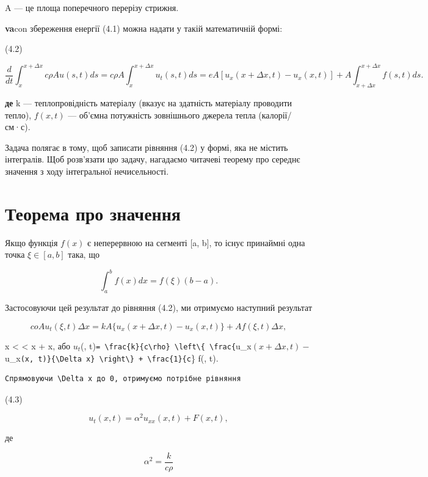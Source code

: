 \documentclass[
  ukrainian,
]{article}
\begin{document}
A --- це площа поперечного перерізу стрижня.

\textbf{va}con збереження енергії (4.1) можна надати у такій
математичній формі:

(4.2)

\[
\frac{d}{dt} \int_{x}^{x+\Delta x} c\rho Au(s, t) ds = c\rho A \int_{x}^{x+\Delta x} u_{t}(s, t) ds = eA \left[ u_{x}(x+\Delta x, t) - u_{x}(x, t) \right] + A \int_{x+\Delta x}^{x+\Delta x} f(s, t) ds.
\]

\textbf{де} k --- теплопровідність матеріалу (вказує на здатність
матеріалу проводити тепло), \(f(x, t)\) --- об'ємна потужність
зовнішнього джерела тепла (калорії/см·с).

Задача полягає в тому, щоб записати рівняння (4.2) у формі, яка не
містить інтегралів. Щоб розв'язати цю задачу, нагадаємо читачеві теорему
про середнє значення з ходу інтегральної нечисельності.

\section{Теорема про
значення}\label{ux442ux435ux43eux440ux435ux43cux430-ux43fux440ux43e-ux437ux43dux430ux447ux435ux43dux43dux44f}

Якщо функція \(f(x)\) є неперервною на сегменті {[}a, b{]}, то існує
принаймні одна точка \(\xi \in [a, b]\) така, що

\[
\int_{a}^{b} f(x) dx = f(\xi) (b-a).
\]

Застосовуючи цей результат до рівняння (4.2), ми отримуємо наступний
результат

\[
coAu_{t}(\xi, t) \Delta x = kA\{u_{x}(x + \Delta x, t) - u_{x}(x, t)\} + Af(\xi, t) \Delta x,
\]

x \textless{} \xi \textless{} x + \Delta x, або \(u_t\)(\xi,
t)\texttt{=\ \textbackslash{}frac\{k\}\{c\textbackslash{}rho\}\ \textbackslash{}left\textbackslash{}\{\ \textbackslash{}frac\{}u\_x\((x + \Delta x, t) -\)u\_x\texttt{(x,\ t)\}\{\textbackslash{}Delta\ x\}\ \textbackslash{}right\textbackslash{}\}\ +\ \textbackslash{}frac\{1\}\{c}\rho\}
f(\xi, t).

\begin{verbatim}
Спрямовуючи \Delta x до 0, отримуємо потрібне рівняння
\end{verbatim}

(4.3)

\[
u_t(x, t) = \alpha^2 u_{xx}(x, t) + F(x, t),
\]

де

\[
\alpha^{2}=\frac{k}{c\rho}
\]
\end{document}
